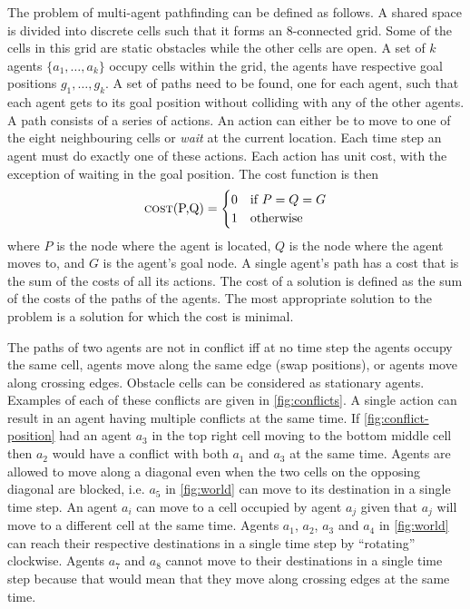 The problem of multi-agent pathfinding can be defined as follows. A shared
space is divided into discrete cells such that it forms an 8-connected grid.
Some of the cells in this grid are static obstacles while the other cells are
open. A set of $k$ agents $\{a_1, \ldots, a_k\}$ occupy cells within the grid,
the agents have respective goal positions $g_1, \ldots, g_k$. A set of paths
need to be found, one for each agent, such that each agent gets to its goal
position without colliding with any of the other agents. A path consists of a
series of actions. An action can either be to move to one of the eight
neighbouring cells or \emph{wait} at the current location. Each time step an
agent must do exactly one of these actions. Each action has unit cost, with the 
exception of waiting in the goal position. The cost function is then
\[
\text{\textsc{cost}(P,Q)} =
\begin{cases}
    0 & \text{if } P = Q = G \\
    1 & \text{otherwise}
\end{cases}
\]
where $P$ is the node where the agent is located, $Q$ is the node where the
agent moves to, and $G$ is the agent's goal node. A single agent's path has a
cost that is the sum of the costs of all its actions. The cost of a solution is
defined as the sum of the costs of the paths of the agents. The most
appropriate solution to the problem is a solution for which the cost is minimal.

The paths of two agents are not in conflict iff at no time step the agents
occupy the same cell, agents move along the same edge (swap positions), or
agents move along crossing edges. Obstacle cells can be considered as
stationary agents. Examples of each of these conflicts are given in 
\autoref{fig:conflicts}. A single action can result in an agent having multiple 
conflicts at the same time. If \autoref{fig:conflict-position} had an agent 
$a_3$ in the top right cell moving to the bottom middle cell then $a_2$ would 
have a conflict with both $a_1$ and $a_3$ at the same time. Agents are allowed 
to move along a diagonal even when the two cells on the opposing diagonal are 
blocked, i.e. $a_5$ in \autoref{fig:world} can move to its destination in a 
single time step. An agent $a_i$ can move to a cell occupied by agent $a_j$ 
given that $a_j$ will move to a different cell at the same time. Agents $a_1$, 
$a_2$, $a_3$ and $a_4$ in \autoref{fig:world} can reach their respective 
destinations in a single time step by ``rotating'' clockwise. Agents $a_7$ and 
$a_8$ cannot move to their destinations in a single time step because that 
would mean that they move along crossing edges at the same time.
